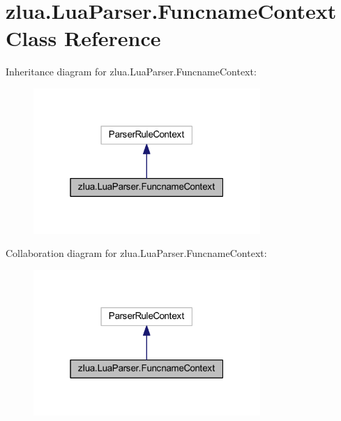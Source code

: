 \hypertarget{classzlua_1_1_lua_parser_1_1_funcname_context}{}\section{zlua.\+Lua\+Parser.\+Funcname\+Context Class Reference}
\label{classzlua_1_1_lua_parser_1_1_funcname_context}


Inheritance diagram for zlua.\+Lua\+Parser.\+Funcname\+Context\+:
\nopagebreak
\begin{figure}[H]
\begin{center}
\leavevmode
\includegraphics[width=244pt]{classzlua_1_1_lua_parser_1_1_funcname_context__inherit__graph}
\end{center}
\end{figure}


Collaboration diagram for zlua.\+Lua\+Parser.\+Funcname\+Context\+:
\nopagebreak
\begin{figure}[H]
\begin{center}
\leavevmode
\includegraphics[width=244pt]{classzlua_1_1_lua_parser_1_1_funcname_context__coll__graph}
\end{center}
\end{figure}
